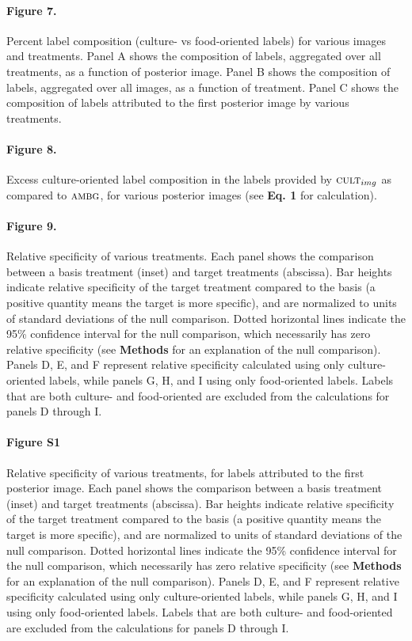 \documentclass[a4paper]{report}
\begin{document}
\paragraph{Figure 7.}
Percent label composition (culture- vs food-oriented labels) for 
various images and treatments.  Panel A shows the 
composition of labels, aggregated over all treatments, as a function of 
posterior image.
Panel B shows the composition of labels, aggregated over all images, as
a function of treatment.  Panel C shows the composition of labels 
attributed to the first posterior image by various treatments.

\paragraph{Figure 8.}
Excess culture-oriented label composition in the labels provided
by $\textsc{cult}_{img}$ as compared to $\textsc{ambg}$, for various
posterior images (see \textbf{Eq. 1} for calculation).

\paragraph{Figure 9.}
Relative specificity of various treatments.
Each panel shows the comparison between a basis treatment (inset) and 
target treatments (abscissa).
Bar heights indicate relative specificity of the target 
treatment compared to the basis (a positive quantity means the target 
is more specific), and are normalized to units of standard 
deviations of the null comparison.  Dotted horizontal lines indicate
the 95\% confidence interval for the null comparison, which necessarily
has zero relative specificity (see \textbf{Methods} 
for an explanation of the null comparison).  Panels D, E, and F 
represent relative specificity calculated using only culture-oriented
labels, while panels G, H, and I using only food-oriented labels.
Labels that are both culture- and food-oriented are excluded from the
calculations for panels D through I.

\paragraph{Figure S1}
Relative specificity of various treatments, for labels attributed
to the first posterior image.
Each panel shows the comparison between a basis treatment (inset) and 
target treatments (abscissa).
Bar heights indicate relative specificity of the target 
treatment compared to the basis (a positive quantity means the target 
is more specific), and are normalized to units of standard 
deviations of the null comparison.  Dotted horizontal lines indicate
the 95\% confidence interval for the null comparison, which necessarily
has zero relative specificity (see \textbf{Methods} 
for an explanation of the null comparison).  Panels D, E, and F 
represent relative specificity calculated using only culture-oriented
labels, while panels G, H, and I using only food-oriented labels.
Labels that are both culture- and food-oriented are excluded from the
calculations for panels D through I.
\end{document}
